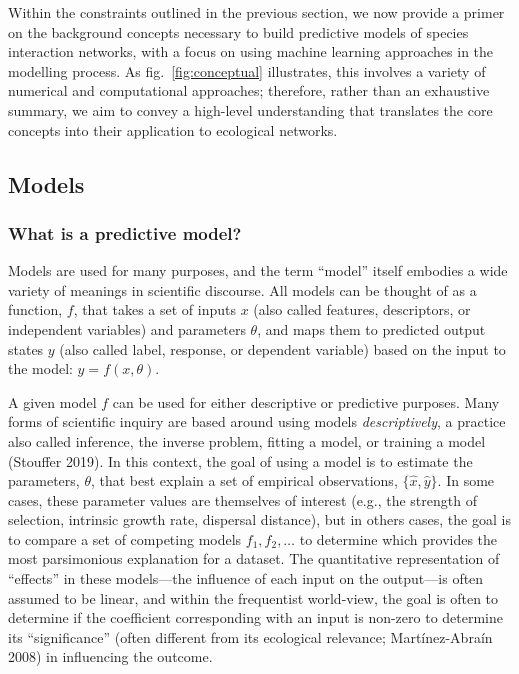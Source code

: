 \documentclass[11pt]{article}
\begin{document}
Within the constraints outlined in the previous section, we now provide
a primer on the background concepts necessary to build predictive models
of species interaction networks, with a focus on using machine learning
approaches in the modelling process. As fig.~\ref{fig:conceptual}
illustrates, this involves a variety of numerical and computational
approaches; therefore, rather than an exhaustive summary, we aim to
convey a high-level understanding that translates the core concepts into
their application to ecological networks.

\hypertarget{models}{%
\subsection{Models}\label{models}}

\hypertarget{what-is-a-predictive-model}{%
\subsubsection{What is a predictive
model?}\label{what-is-a-predictive-model}}

Models are used for many purposes, and the term ``model'' itself
embodies a wide variety of meanings in scientific discourse. All models
can be thought of as a function, \(f\), that takes a set of inputs \(x\)
(also called features, descriptors, or independent variables) and
parameters \(\theta\), and maps them to predicted output states \(y\)
(also called label, response, or dependent variable) based on the input
to the model: \(y=f(x,\theta)\).

A given model \(f\) can be used for either descriptive or predictive
purposes. Many forms of scientific inquiry are based around using models
\emph{descriptively}, a practice also called inference, the inverse
problem, fitting a model, or training a model (Stouffer 2019). In this
context, the goal of using a model is to estimate the parameters,
\(\theta\), that best explain a set of empirical observations,
\(\{\hat{x}, \hat{y}\}\). In some cases, these parameter values are
themselves of interest (e.g., the strength of selection, intrinsic
growth rate, dispersal distance), but in others cases, the goal is to
compare a set of competing models \(f_1, f_2, \dots\) to determine which
provides the most parsimonious explanation for a dataset. The
quantitative representation of ``effects'' in these models---the
influence of each input on the output---is often assumed to be linear,
and within the frequentist world-view, the goal is often to determine if
the coefficient corresponding with an input is non-zero to determine its
``significance'' (often different from its ecological relevance;
Martínez-Abraín 2008) in influencing the outcome.
\end{document}
